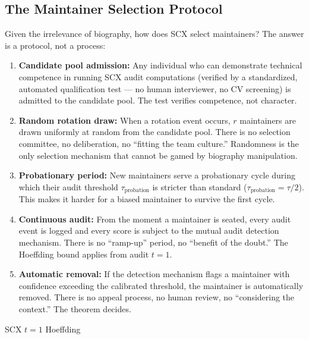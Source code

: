 \documentclass[12pt,a4paper]{article}
\theoremstyle{remark}
\begin{document}
\subsection{The Maintainer Selection Protocol}

Given the irrelevance of biography, how does SCX select maintainers? The answer
is a protocol, not a process:

\begin{protocol}\label{prot:selection}
\begin{enumerate}[label=\textbf{Step \arabic*:}, leftmargin=*]
    \item \textbf{Candidate pool admission:} Any individual who can demonstrate
          technical competence in running SCX audit computations (verified by a
          standardized, automated qualification test — no human interviewer, no
          CV screening) is admitted to the candidate pool. The test verifies
          competence, not character.
    \item \textbf{Random rotation draw:} When a rotation event occurs, $r$
          maintainers are drawn uniformly at random from the candidate pool.
          There is no selection committee, no deliberation, no ``fitting the
          team culture.'' Randomness is the only selection mechanism that cannot
          be gamed by biography manipulation.
    \item \textbf{Probationary period:} New maintainers serve a probationary
          cycle during which their audit threshold $\tau_{\text{probation}}$ is
          stricter than standard ($\tau_{\text{probation}} = \tau / 2$). This
          makes it harder for a biased maintainer to survive the first cycle.
    \item \textbf{Continuous audit:} From the moment a maintainer is seated,
          every audit event is logged and every score is subject to the mutual
          audit detection mechanism. There is no ``ramp-up'' period, no
          ``benefit of the doubt.'' The Hoeffding bound applies from audit $t=1$.
    \item \textbf{Automatic removal:} If the detection mechanism flags a
          maintainer with confidence exceeding the calibrated threshold, the
          maintainer is automatically removed. There is no appeal process, no
          human review, no ``considering the context.'' The theorem decides.
\end{enumerate}
\end{protocol}

\noindent\textbf{}
SCX
$t=1$
Hoeffding
\end{document}
